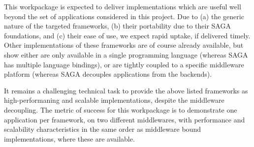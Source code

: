 \documentclass[10pt,letterpaper]{article}
\newcommand{\up}{\vspace*{-0.25em}}
\begin{document}

This workpackage is expected to deliver implementations which are
useful well beyond the set of applications considered in this project.
Due to (a) the generic nature of the targeted frameworks, (b) their
portability due to their SAGA foundations, and (c) their ease of use,
we expect rapid uptake, if delivered timely.  Other implementations of
these frameworks are of course already available, but show either are
only available in a single programming language (whereas SAGA has
multiple language bindings), or are tightly coupled to a specific
middleware platform (whereas SAGA decouples applications from the
backends).

It remains a challenging technical task to provide the above listed
frameworks as high-performaning and scalable implementations, despite
the middleware decoupling.  The metric of success for this workpackage
is to demonstrate one application per framework, on two different
middlewares, with performance and scalability characteristics in the
same order as middleware bound implementations, where these are
available.\\[-0.5em]




\end{document}
